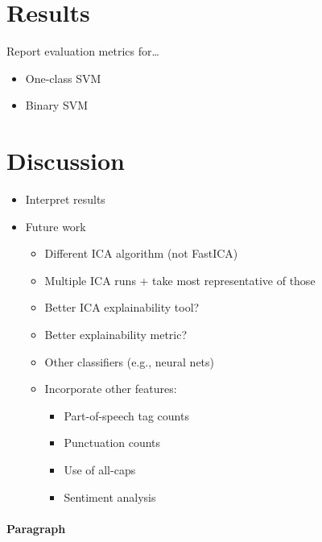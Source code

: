 \documentclass{article}
\begin{document}
\hypertarget{results}{%
\section{Results}\label{results}}

\label{sec:results} Report evaluation metrics for\ldots{}

\begin{itemize}
\tightlist
\item
  One-class SVM
\item
  Binary SVM
\end{itemize}

\hypertarget{discussion}{%
\section{Discussion}\label{discussion}}

\label{sec:discuss}

\begin{itemize}
\tightlist
\item
  Interpret results
\item
  Future work

  \begin{itemize}
  \tightlist
  \item
    Different ICA algorithm (not FastICA)
  \item
    Multiple ICA runs + take most representative of those
  \item
    Better ICA explainability tool?
  \item
    Better explainability metric?
  \item
    Other classifiers (e.g., neural nets)
  \item
    Incorporate other features:

    \begin{itemize}
    \tightlist
    \item
      Part-of-speech tag counts
    \item
      Punctuation counts
    \item
      Use of all-caps
    \item
      Sentiment analysis
    \end{itemize}
  \end{itemize}
\end{itemize}

\paragraph{Paragraph}
\end{document}
